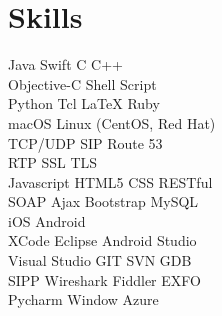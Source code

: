 \documentclass[a4paper]{lyu-resume} %
\begin{document}
\begin{minipage}[t]{0.33\textwidth} %


\section{Skills}

Java \textbullet{} Swift \textbullet{} C \textbullet{} C++\\
Objective-C \textbullet{} Shell Script \\
Python \textbullet{} Tcl \textbullet{} \LaTeX \textbullet{} Ruby\\
macOS \textbullet{} Linux (CentOS, Red Hat)\\
TCP/UDP \textbullet{} SIP \textbullet{} Route 53 \\
\textbullet{} RTP \textbullet{} SSL \textbullet{} TLS \\
Javascript \textbullet{} HTML5 \textbullet{} CSS \textbullet{} RESTful \\
SOAP \textbullet{} Ajax \textbullet{} Bootstrap \textbullet{} MySQL \\ 
iOS \textbullet{} Android \\
XCode \textbullet{} Eclipse \textbullet{} Android Studio\\
Visual Studio \textbullet{} GIT \textbullet{} SVN \textbullet{} GDB \\
SIPP \textbullet{} Wireshark \textbullet{} Fiddler \textbullet{} EXFO \\
Pycharm \textbullet{} Window Azure \\
\sectionspace %





\end{minipage}
\end{document}
